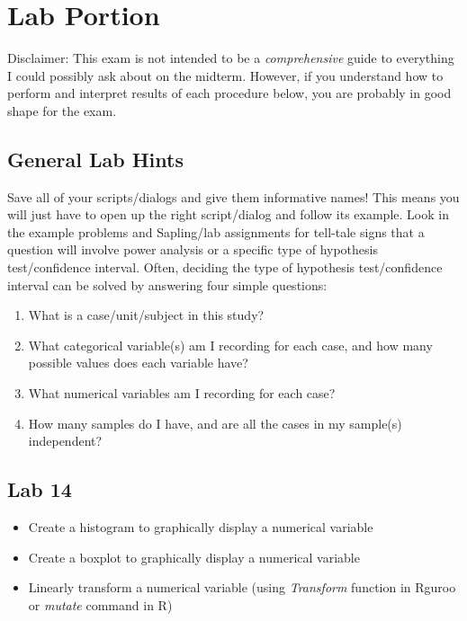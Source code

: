\documentclass[11pt]{article} %
\begin{document}
\newpage

\section{Lab Portion}

Disclaimer: This exam is not intended to be a \emph{comprehensive} guide to everything I could possibly ask about on the midterm. However, if you understand how to perform and interpret results of each procedure below, you are probably in good shape for the exam.

\subsection{General Lab Hints}

Save all of your scripts/dialogs and give them informative names! This means you will just have to open up the right script/dialog and follow its example. Look in the example problems and Sapling/lab assignments for tell-tale signs that a question will involve power analysis or a specific type of hypothesis test/confidence interval. Often, deciding the type of hypothesis test/confidence interval can be solved by answering four simple questions:

\begin{enumerate}
\item What is a case/unit/subject in this study?
\item What categorical variable(s) am I recording for each case, and how many possible values does each variable have?
\item What numerical variables am I recording for each case?
\item How many samples do I have, and are all the cases in my sample(s) independent?
\end{enumerate}

\subsection{Lab 14}

\begin{itemize}
\item Create a histogram to graphically display a numerical variable
\item Create a boxplot to graphically display a numerical variable
\item Linearly transform a numerical variable (using \emph{Transform} function in Rguroo or \emph{mutate} command in R)
\end{itemize}
\end{document}
